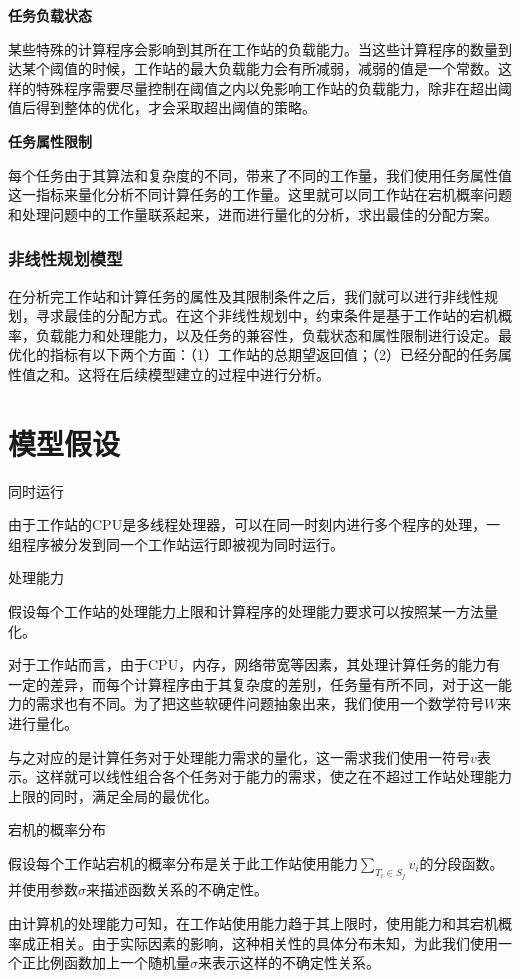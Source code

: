 \documentclass{MathorCupmodeling}
\begin{document}
\bf{任务负载状态}

某些特殊的计算程序会影响到其所在工作站的负载能力。当这些计算程序的数量到达某个阈值的时候，工作站的最大负载能力会有所减弱，减弱的值是一个常数。这样的特殊程序需要尽量控制在阈值之内以免影响工作站的负载能力，除非在超出阈值后得到整体的优化，才会采取超出阈值的策略。

\bf{任务属性限制}

每个任务由于其算法和复杂度的不同，带来了不同的工作量，我们使用任务属性值这一指标来量化分析不同计算任务的工作量。这里就可以同工作站在宕机概率问题和处理问题中的工作量联系起来，进而进行量化的分析，求出最佳的分配方案。

\subsubsection{非线性规划模型}

在分析完工作站和计算任务的属性及其限制条件之后，我们就可以进行非线性规划，寻求最佳的分配方式。在这个非线性规划中，约束条件是基于工作站的宕机概率，负载能力和处理能力，以及任务的兼容性，负载状态和属性限制进行设定。最优化的指标有以下两个方面：（1）工作站的总期望返回值；（2）已经分配的任务属性值之和。这将在后续模型建立的过程中进行分析。

	\section{模型假设}

同时运行

由于工作站的CPU是多线程处理器，可以在同一时刻内进行多个程序的处理，一组程序被分发到同一个工作站运行即被视为同时运行。

处理能力

假设每个工作站的处理能力上限和计算程序的处理能力要求可以按照某一方法量化。

对于工作站而言，由于CPU，内存，网络带宽等因素，其处理计算任务的能力有一定的差异，而每个计算程序由于其复杂度的差别，任务量有所不同，对于这一能力的需求也有不同。为了把这些软硬件问题抽象出来，我们使用一个数学符号$W$来进行量化。

与之对应的是计算任务对于处理能力需求的量化，这一需求我们使用一符号$v$表示。这样就可以线性组合各个任务对于能力的需求，使之在不超过工作站处理能力上限的同时，满足全局的最优化。

宕机的概率分布

假设每个工作站宕机的概率分布是关于此工作站使用能力$\sum_{T_{i}\in S_j}v_i$的分段函数。并使用参数$\sigma$来描述函数关系的不确定性。

由计算机的处理能力可知，在工作站使用能力趋于其上限时，使用能力和其宕机概率成正相关。由于实际因素的影响，这种相关性的具体分布未知，为此我们使用一个正比例函数加上一个随机量$\sigma$来表示这样的不确定性关系。
\end{document}
